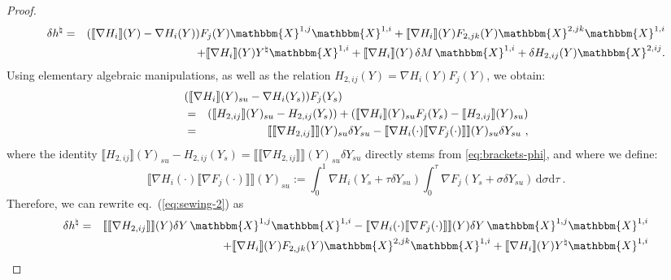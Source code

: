 \documentclass[11pt,reqno,oneside]{amsart}
\numberwithin{equation}{section}
\newcommand{\assign}{:=}
\newcommand{\mathd}{\mathrm{d}}
\begin{document}
\begin{proof}
  \begin{eqnarray}\label{eq:sewing-2}
\delta h^{\natural}
		& = & (\llbracket \nabla H_i\rrbracket (Y)  - \nabla H_i
    (Y)) F_j (Y) \mathbbm{X}^{1,j} \mathbbm{X}^{1,i} + \llbracket \nabla H_i \rrbracket(Y)
     F_{2,jk} (Y) \mathbbm{X}^{2,jk} \mathbbm{X}^{1,i}\nonumber \\
		& &\hspace{2cm}+ \llbracket \nabla H_i \rrbracket(Y)
     Y^{\natural} \mathbbm{X}^{1,i} + \llbracket \nabla H_i\rrbracket (Y)\,  \delta M \, \mathbbm{X}^{1,i} + \delta H_{2,ij} (Y)
    \mathbbm{X}^{2,ij} .
  \end{eqnarray}
Using elementary algebraic manipulations, as well as the relation $H_{2,ij} (Y) = \nabla H_i (Y) F_j (Y)$, we obtain: 
  \begin{eqnarray*}
\lefteqn{  (\llbracket \nabla H_i\rrbracket (Y)_{s u}  - \nabla H_i (Y_s)) F_j (Y_s)}\\  
  &=&  (\llbracket H_{2,ij}\rrbracket (Y)_{s u}  - H_{2,ij} (Y_s)) + (\llbracket \nabla H_i\rrbracket (Y)_{s u}
    F_j (Y_s) - \llbracket H_{2,ij} \rrbracket(Y)_{s u}) \\
    & = & \llbracket \llbracket \nabla H_{2,ij}\rrbracket \rrbracket (Y)_{s u}  \delta Y_{s u}
    - \llbracket \nabla H_i (\cdot) \llbracket \nabla F_j (\cdot) \rrbracket \rrbracket(Y)_{s u}
    \delta Y_{s u} \ ,
  \end{eqnarray*}
where the identity $\llbracket H_{2,ij}\rrbracket (Y)_{s u}  - H_{2,ij} (Y_s)=\llbracket \llbracket \nabla H_{2,ij}\rrbracket \rrbracket (Y)_{s u}  \delta Y_{s u}$ directly stems from \eqref{eq:brackets-phi}, and where we define:
  \[ \llbracket \nabla H_i (\cdot) \llbracket \nabla F_j (\cdot) \rrbracket \rrbracket(Y)_{s
     u} \assign \int_0^1 \nabla H_i (Y_s + \tau \delta Y_{s u}) \int_0^{\tau}
     \nabla F_j (Y_s + \sigma \delta Y_{s u}) \, \mathd \sigma \mathd \tau\ . 
  \]
Therefore,  we can rewrite eq.~(\ref{eq:sewing-2}) as 
  \begin{eqnarray}
\delta h^{\natural}
    & = & \llbracket \llbracket \nabla H_{2,ij}  \rrbracket \rrbracket(Y) \delta
    Y\,\mathbbm{X}^{1,j} \mathbbm{X}^{1,i} - \llbracket \nabla H_i (\cdot) \llbracket \nabla F_j
    (\cdot) \rrbracket \rrbracket(Y) \delta Y\, \mathbbm{X}^{1,j} \mathbbm{X}^{1,i} \nonumber \\
		 &  &\hspace{2cm} + \llbracket\nabla H_i  \rrbracket(Y) F_{2,jk} (Y) \mathbbm{X}^{2,jk} \mathbbm{X}^{1,i} + \llbracket \nabla H_i \rrbracket(Y) Y^{\natural} \mathbbm{X}^{1,i}\nonumber \\

\end{eqnarray}
\end{proof}
\end{document}
